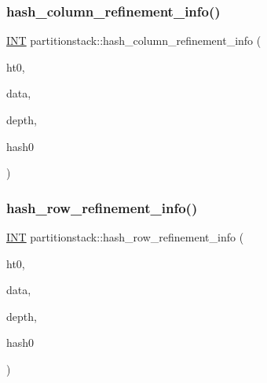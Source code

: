 \subsubsection{\texorpdfstring{hash\+\_\+column\+\_\+refinement\+\_\+info()}{hash\_column\_refinement\_info()}}
{\footnotesize\ttfamily \mbox{\hyperlink{galois_8h_a09fddde158a3a20bd2dcadb609de11dc}{I\+NT}} partitionstack\+::hash\+\_\+column\+\_\+refinement\+\_\+info (\begin{DoxyParamCaption}\item[{\mbox{\hyperlink{galois_8h_a09fddde158a3a20bd2dcadb609de11dc}{I\+NT}}}]{ht0,  }\item[{\mbox{\hyperlink{galois_8h_a09fddde158a3a20bd2dcadb609de11dc}{I\+NT}} $\ast$}]{data,  }\item[{\mbox{\hyperlink{galois_8h_a09fddde158a3a20bd2dcadb609de11dc}{I\+NT}}}]{depth,  }\item[{\mbox{\hyperlink{galois_8h_a09fddde158a3a20bd2dcadb609de11dc}{I\+NT}}}]{hash0 }\end{DoxyParamCaption})}

\mbox{\label{classpartitionstack_a878dad34f16a64fcd9ac6bef56b494e4}} 
\subsubsection{\texorpdfstring{hash\+\_\+row\+\_\+refinement\+\_\+info()}{hash\_row\_refinement\_info()}}
{\footnotesize\ttfamily \mbox{\hyperlink{galois_8h_a09fddde158a3a20bd2dcadb609de11dc}{I\+NT}} partitionstack\+::hash\+\_\+row\+\_\+refinement\+\_\+info (\begin{DoxyParamCaption}\item[{\mbox{\hyperlink{galois_8h_a09fddde158a3a20bd2dcadb609de11dc}{I\+NT}}}]{ht0,  }\item[{\mbox{\hyperlink{galois_8h_a09fddde158a3a20bd2dcadb609de11dc}{I\+NT}} $\ast$}]{data,  }\item[{\mbox{\hyperlink{galois_8h_a09fddde158a3a20bd2dcadb609de11dc}{I\+NT}}}]{depth,  }\item[{\mbox{\hyperlink{galois_8h_a09fddde158a3a20bd2dcadb609de11dc}{I\+NT}}}]{hash0 }\end{DoxyParamCaption})}

\mbox{\label{classpartitionstack_ad3c6531c5f16f206a1d0daa16260ea3a}} 
